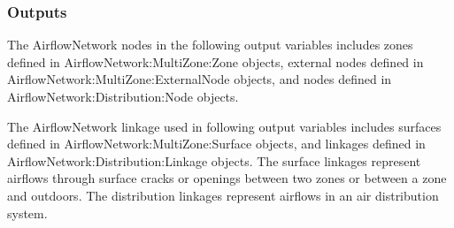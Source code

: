 \subsubsection{Outputs}\label{outputs-002}

The AirflowNetwork nodes in the following output variables includes zones defined in AirflowNetwork:MultiZone:Zone objects, external nodes defined in AirflowNetwork:MultiZone:ExternalNode objects, and nodes defined in AirflowNetwork:Distribution:Node objects.

The AirflowNetwork linkage used in following output variables includes surfaces defined in AirflowNetwork:MultiZone:Surface objects, and linkages defined in AirflowNetwork:Distribution:Linkage objects. The surface linkages represent airflows through surface cracks or openings between two zones or between a zone and outdoors. The distribution linkages represent airflows in an air distribution system.

